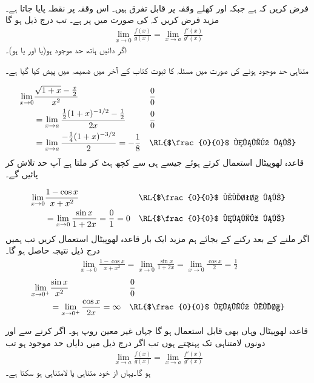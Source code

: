 \\
فرض کریں کہ  ہے جبکہ    اور  کھلے وقفہ   پر قابل تفرق ہیں۔ اس وقفہ پر نقطہ  پایا جاتا ہے۔مزید فرض کریں کہ  کی صورت میں  پر  ہے۔ تب درج ذیل ہو گا
\begin{align}
\lim_{x\to 0}\frac{f(x)}{g(x)}=\lim_{x\to a}\frac{f'(x)}{g'(x)}
\end{align}
اگر دائیں ہاتھ حد موجود ہو(یا   اور یا  ہو)۔

متناہی حد موجود ہونے  کی صورت میں مسئلہ کا ثبوت کتاب کے آخر میں ضمیمہ    میں پیش کیا گیا ہے۔ 

\begin{align*}
\lim_{x\to 0}&\frac{\sqrt{1+x}-\frac{x}{2}}{x^2}&&\frac{0}{0}\\
&=\lim_{x\to a}\frac{\frac{1}{2}(1+x)^{-1/2}-\frac{1}{2}}{2x}&&\frac{0}{0}\\
&=\lim_{x\to a}\frac{-\frac{1}{4}(1+x)^{-3/2}}{2}=-\frac{1}{8}&&\text{\RL{$\frac{0}{0}$ نہیں ہے}}
\end{align*}
قاعدہ لھوپیٹال استعمال کرتے ہوئے جیسے   ہی  سے کچھ ہٹ کر ملتا ہے آپ حد تلاش کر پائیں گے۔

\begin{align*}
\lim_{x\to 0}&\frac{1-\cos x}{x+x^2}&&\text{\RL{$\frac{0}{0}$ ملتا ہے}}\\
&=\lim_{x\to 0}\frac{\sin x}{1+2x}=\frac{0}{1}=0&&\text{\RL{$\frac{0}{0}$ نہیں ہے}}
\end{align*}
اگر  ملنے کے بعد رکنے کے بجائے ہم مزید ایک بار قاعدہ لھوپیٹال استعمال کریں تب ہمیں درج ذیل  نتیجہ حاصل ہو گا۔
\begin{align*}
\lim_{x\to0}\frac{1-\cos x}{x+x^2}=\lim_{x\to 0}\frac{\sin x}{1+2x}=\lim_{x\to 0}\frac{\cos x}{2}=\frac{1}{2}
\end{align*} 
\begin{align*}
\lim_{x\to 0^+}&\frac{\sin x}{x^2}&&\frac{0}{0}\\
&=\lim_{x\to 0^+}\frac{\cos x}{2x}=\infty&&\text{\RL{$\frac{0}{0}$ نہیں ملا}}
\end{align*}

قاعدہ لھوپیٹال وہاں بھی قابل استعمال ہو گا جہاں غیر معین روپ  ہو۔ اگر  کرنے سے  اور  دونوں لامتناہی تک پہنچتے ہوں تب اگر درج ذیل میں دایاں حد موجود ہو تب
\begin{align*}
\lim_{x\to a}\frac{f(x)}{g(x)}=\lim_{x\to a}\frac{f'(x)}{g'(x)}
\end{align*}
ہو گا۔یہاں  از خود متناہی یا لامتناہی ہو سکتا ہے۔

